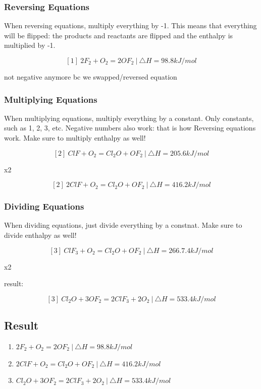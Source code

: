 \documentclass[12pt]{article} %
\begin{document}
\singlespace

\subsubsection{Reversing Equations}

When reversing equations, multiply everything by -1. This means that everything will be flipped: the products and reactants are flipped and the enthalpy is multiplied by -1.

$$[1]\ 2F_2 + O_2 = 2OF_2 \  |\ \triangle{H} = 98.8kJ/mol$$

not negative anymore bc we swapped/reversed equation

\subsubsection{Multiplying Equations}

When multiplying equations, multiply everything by a constant. Only constants, such as 1, 2, 3, etc. Negative numbers also work: that is how Reversing equations work. Make sure to multiply enthalpy as well!

$$[2]\ ClF+O_2 = Cl_2O + OF_2\ |\ \triangle{H} = 205.6kJ/mol$$

x2

$$[2]\ 2ClF + O_2 = Cl_2O + OF_2 \ |\ \triangle{H} = 416.2kJ/mol$$

\subsubsection{Dividing Equations}

When dividing equations, just divide everything by a constnat. Make sure to divide enthalpy as well!

$$[3]\ ClF_3 + O_2 = Cl_2O + OF_2\ |\ \triangle{H} = 266.7.4kJ/mol$$

x2

result:

$$[3]\ Cl_2O + 3OF_2 = 2ClF_3 + 2O_2\ |\ \triangle{H} = 533.4kJ/mol$$

\subsection{Result}

\begin{enumerate}
\item $2F_2 + O_2 = 2OF_2\ |\ \triangle{H} = 98.8kJ/mol$
\item $2ClF + O_2 = Cl_2O + OF_2\ |\ \triangle{H} = 416.2kJ/mol$
\item $Cl_2O + 3OF_2 = 2ClF_3 + 2O_2\ |\ \triangle{H} = 533.4kJ/mol$
\end{enumerate}
\end{document}
